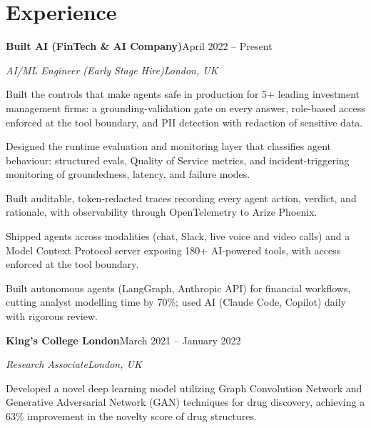 \documentclass[10pt,a4paper]{article}
\newcommand{\entry}[4]{%
  {\color{company}\bfseries #1}\hfill {\color{muted}#2}\par
  \vspace{1pt}
  {\itshape #3}\hfill {\color{muted}\itshape #4}\par
  \vspace{3pt}%
}
\begin{document}
\section{Experience}
\entry{Built AI (FinTech \& AI Company)}{April 2022 -- Present}{AI/ML Engineer (Early Stage Hire)}{London, UK}
\begin{tight}
  \item Built the controls that make agents safe in production for 5+ leading investment management firms: a grounding-validation gate on every answer, role-based access enforced at the tool boundary, and PII detection with redaction of sensitive data.
  \item Designed the runtime evaluation and monitoring layer that classifies agent behaviour: structured evals, Quality of Service metrics, and incident-triggering monitoring of groundedness, latency, and failure modes.
  \item Built auditable, token-redacted traces recording every agent action, verdict, and rationale, with observability through OpenTelemetry to Arize Phoenix.
  \item Shipped agents across modalities (chat, Slack, live voice and video calls) and a Model Context Protocol server exposing 180+ AI-powered tools, with access enforced at the tool boundary.
  \item Built autonomous agents (LangGraph, Anthropic API) for financial workflows, cutting analyst modelling time by 70\%; used AI (Claude Code, Copilot) daily with rigorous review.
\end{tight}

\entry{King's College London}{March 2021 -- January 2022}{Research Associate}{London, UK}
\begin{tight}
  \item Developed a novel deep learning model utilizing Graph Convolution Network and Generative Adversarial Network (GAN) techniques for drug discovery, achieving a 63\% improvement in the novelty score of drug structures.
\end{tight}

\end{document}
